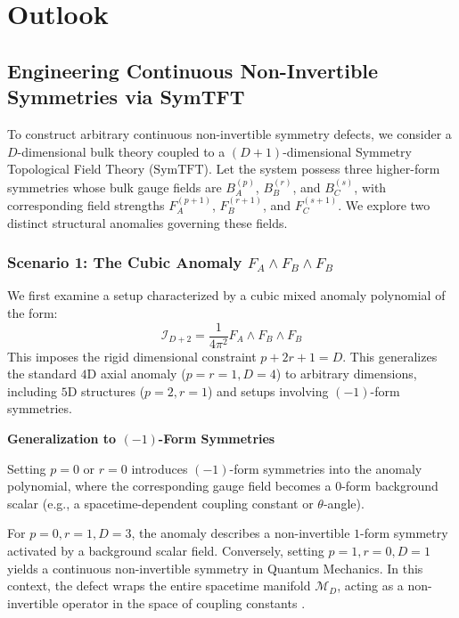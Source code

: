 \documentclass[aps,preprint,nofootinbib,preprintnumbers,eqsecnum,superscriptaddress]{revtex4}
\numberwithin{equation}{section}
\begin{document}
\newpage
\section{Outlook}

\subsection{Engineering Continuous Non-Invertible Symmetries via SymTFT}
\label{sec:engineer_non-inv}

To construct arbitrary continuous non-invertible symmetry defects, we consider a $D$-dimensional bulk theory coupled to a $(D+1)$-dimensional Symmetry Topological Field Theory ($\text{SymTFT}$). Let the system possess three higher-form symmetries whose bulk gauge fields are $B^{(p)}_A$, $B^{(r)}_B$, and $B^{(s)}_C$, with corresponding field strengths $F^{(p+1)}_A$, $F^{(r+1)}_B$, and $F^{(s+1)}_C$. We explore two distinct structural anomalies governing these fields.

\subsubsection{Scenario 1: The Cubic Anomaly $F_A \wedge F_B \wedge F_B$}\label{sec:scenario1}

We first examine a setup characterized by a cubic mixed anomaly polynomial of the form:
\begin{equation}
    \mathcal{I}_{D+2} = \frac{1}{4\pi^2} F_A \wedge F_B \wedge F_B
\end{equation}
This imposes the rigid dimensional constraint $p + 2r + 1 = D$. This generalizes the standard $4\text{D}$ axial anomaly ($p=r=1, D=4$) to arbitrary dimensions, including $5\text{D}$ structures ($p=2, r=1$) and setups involving $(-1)$-form symmetries.

\begin{tcolorbox}
{\bf Generalization to $(-1)$-Form Symmetries}

Setting $p=0$ or $r=0$ introduces $(-1)$-form symmetries into the anomaly polynomial, where the corresponding gauge field becomes a $0$-form background scalar (e.g., a spacetime-dependent coupling constant or $\theta$-angle). 

For $p=0, r=1, D=3$, the anomaly describes a non-invertible $1$-form symmetry activated by a background scalar field. Conversely, setting $p=1, r=0, D=1$ yields a continuous non-invertible symmetry in Quantum Mechanics. In this context, the defect wraps the entire spacetime manifold $\mathcal{M}_D$, acting as a non-invertible operator in the space of coupling constants \cite{lin2025decompositionnoninvertible1formsymmetries}.
\end{tcolorbox}
\end{document}
